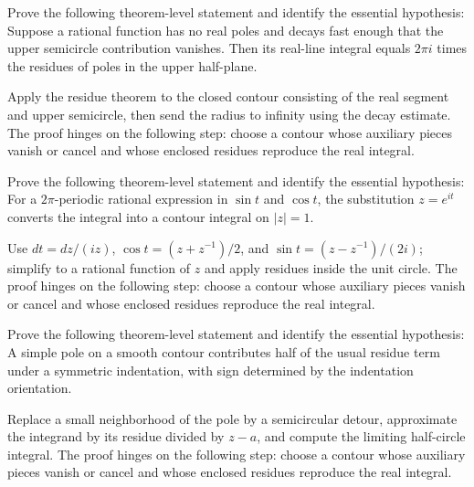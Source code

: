 \begin{problem}\label{prob:iv11-problem-09}
Prove the following theorem-level statement and identify the essential hypothesis: Suppose a rational function has no real poles and decays fast enough that the upper semicircle contribution vanishes. Then its real-line integral equals $2\pi i$ times the residues of poles in the upper half-plane.
\end{problem}
\begin{solution}
Apply the residue theorem to the closed contour consisting of the real segment and upper semicircle, then send the radius to infinity using the decay estimate. The proof hinges on the following step: choose a contour whose auxiliary pieces vanish or cancel and whose enclosed residues reproduce the real integral.
\end{solution}

\begin{problem}\label{prob:iv11-problem-10}
Prove the following theorem-level statement and identify the essential hypothesis: For a $2\pi$-periodic rational expression in $\sin t$ and $\cos t$, the substitution $z=e^{it}$ converts the integral into a contour integral on $|z|=1$.
\end{problem}
\begin{solution}
Use $dt=dz/(iz)$, $\cos t=(z+z^{-1})/2$, and $\sin t=(z-z^{-1})/(2i)$; simplify to a rational function of $z$ and apply residues inside the unit circle. The proof hinges on the following step: choose a contour whose auxiliary pieces vanish or cancel and whose enclosed residues reproduce the real integral.
\end{solution}

\begin{problem}\label{prob:iv11-problem-11}
Prove the following theorem-level statement and identify the essential hypothesis: A simple pole on a smooth contour contributes half of the usual residue term under a symmetric indentation, with sign determined by the indentation orientation.
\end{problem}
\begin{solution}
Replace a small neighborhood of the pole by a semicircular detour, approximate the integrand by its residue divided by $z-a$, and compute the limiting half-circle integral. The proof hinges on the following step: choose a contour whose auxiliary pieces vanish or cancel and whose enclosed residues reproduce the real integral.
\end{solution}

